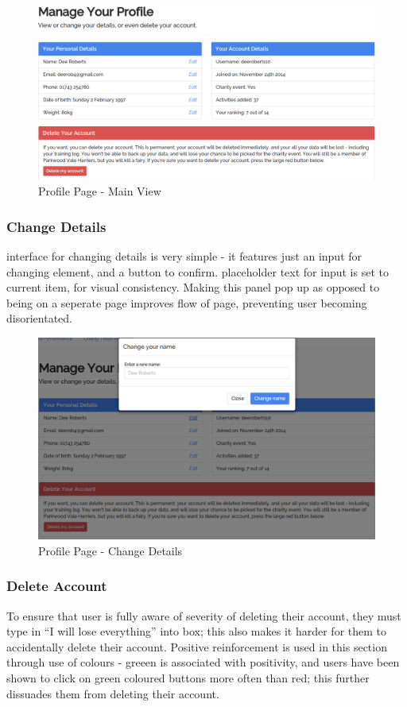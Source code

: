 \documentclass{article}[12pt,a4paper]
\begin{document}
\begin{figure}[h!]
  \includegraphics[scale=0.35]{final_ui/profile}
  \caption{Profile Page - Main View}
\end{figure}
\clearpage

\subsubsection{Change Details}
interface for changing details is very simple - it features just an input for changing element, and a button to confirm. placeholder text for input is set to current item, for visual consistency. Making this panel pop up as opposed to being on a seperate page improves flow of page, preventing user becoming disorientated.

\begin{figure}[h!]
  \includegraphics[scale=0.35]{final_ui/profile_change}
  \caption{Profile Page - Change Details}
\end{figure}
\clearpage

\subsubsection{Delete Account}
To ensure that user is fully aware of severity of deleting their account, they must type in ``I will lose everything'' into box; this also makes it harder for them to accidentally delete their account. Positive reinforcement is used in this section through use of colours - greeen is associated with positivity, and users have been shown to click on green coloured buttons more often than red; this further dissuades them from deleting their account.
\end{document}
